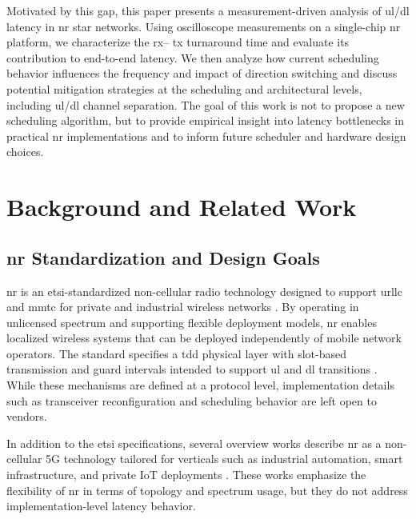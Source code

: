 \documentclass[conference]{IEEEtran}
\begin{document}
Motivated by this gap, this paper presents a measurement-driven analysis of \gls{ul}/\gls{dl} latency in \gls{nr} star networks. Using oscilloscope measurements on a single-chip \gls{nr} platform, we characterize the  \gls{rx}-- \gls{tx} turnaround time and evaluate its contribution to end-to-end latency. We then analyze how current scheduling behavior influences the frequency and impact of direction switching and discuss potential mitigation strategies at the scheduling and architectural levels, including \gls{ul}/\gls{dl} channel separation. The goal of this work is not to propose a new scheduling algorithm, but to provide empirical insight into latency bottlenecks in practical \gls{nr} implementations and to inform future scheduler and hardware design choices.


\section{Background and Related Work}

\subsection{\gls{nr} Standardization and Design Goals}

\gls{nr}  is an \gls{etsi}-standardized non-cellular radio technology designed to support \gls{urllc} and \gls{mmtc} for private and industrial wireless networks \cite{etsi_dect_nr_overview}. By operating in unlicensed spectrum and supporting flexible deployment models, \gls{nr} enables localized wireless systems that can be deployed independently of mobile network operators. The standard specifies a \gls{tdd} physical layer with slot-based transmission and guard intervals intended to support \gls{ul} and \gls{dl} transitions \cite{etsi_dect_nr_architecture}. While these mechanisms are defined at a protocol level, implementation details such as transceiver reconfiguration and scheduling behavior are left open to vendors.

In addition to the \gls{etsi} specifications, several overview works describe \gls{nr} as a non-cellular 5G technology tailored for verticals such as industrial automation, smart infrastructure, and private IoT deployments \cite{perez_guirao_dect_nr_essentials}. These works emphasize the flexibility of \gls{nr} in terms of topology and spectrum usage, but they do not address implementation-level latency behavior.
\end{document}
